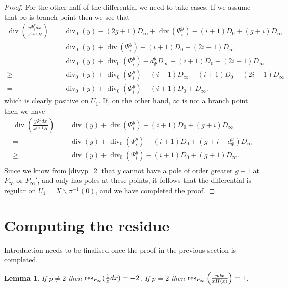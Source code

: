 \documentclass[draft, 11pt]{article} %
\theoremstyle{plain}
\newtheorem{lem}[defn]{Lemma}
\theoremstyle{remark}
\DeclareMathOperator{\di}{div}
\begin{document}
\begin{proof}
For the other half of the differential we need to take cases.
If we assume that $\infty$ is branch point then we see that
\begin{align*}
\di\left(\frac{y\Psi_i^y dx}{x^{i+1}H} \right)  =  & \di_0(y) - (2g+1)D_\infty + \di(\Psi_i^y) - (i+1)D_0 + (g+i)D_\infty \\
 =  & \di_0(y) + \di(\Psi_i^y) -(i+1)D_0 + (2i -1)D_\infty \\
 = &  \di_0(y) + \di_0(\Psi_i^y) - d_\Psi^yD_\infty - (i+1)D_0 + (2i-1)D_\infty \\
 \geq &  \di_0(y) + \di_0(\Psi_i^y) -(i-1)D_\infty -(i+1)D_0 + (2i-1)D_\infty \\
 =   &\di_0(y) + \di_0(\Psi_i^y) -(i+1)D_0 + D_\infty.
\end{align*}
which is clearly positive on $U_1$.
If, on the other hand, $\infty$ is not a branch point then we have
\begin{align*}
\di\left(\frac{y\Psi_i^y dx}{x^{i+1}H} \right)  =  & \di(y) + \di(\Psi_i^y) - (i+1)D_0 + (g+i)D_\infty \\
= & \di(y) + \di_0(\Psi_i^y) - (i+1)D_0 + (g+i - d_\Psi^y)D_\infty \\
\geq & \di(y) + \di_0(\Psi_i^y) - (i+1)D_0 + (g+1)D_\infty. \\
\end{align*}
Since we know from \eqref{divyp=2} that $y$ cannot have a pole of order greater $g+1$ at $P_\infty$ or $P_\infty'$, and only has poles at these points, it follows that the differential is regular on $U_1 = X \backslash \pi^{-1}(0)$, and we have completed the proof.


\end{proof}

\section{Computing the residue}

Introduction needs to be finalised once the proof in the previous section is completed.

\begin{lem}
If $p \neq 2$ then ${\rm res}_{P_\infty}(\frac{1}{x}dx) = -2$.
If $p=2$ then ${\rm res}_{P_\infty}\left(\frac{ydx}{xH(x)}\right) = 1$.
\end{lem}
\end{document}
